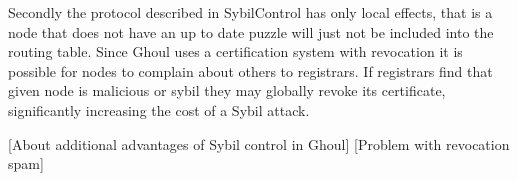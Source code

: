   Secondly the protocol described in SybilControl has only local effects, that
  is a node that does not have an up to date puzzle will just not be included
  into the routing table. Since Ghoul uses a certification system with
  revocation it is possible for nodes to complain about others to registrars. If
  registrars find that given node is malicious or sybil they may globally revoke
  its certificate, significantly increasing the cost of a Sybil attack.

  [About additional advantages of Sybil control in Ghoul]
  [Problem with revocation spam]

